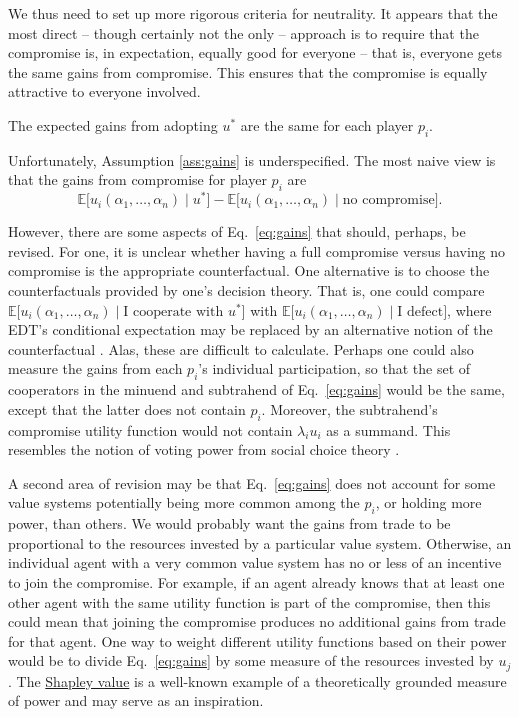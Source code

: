 We thus need to set up more rigorous criteria for neutrality. It appears
that the most direct -- though certainly not the only -- approach is to
require that the compromise is, in expectation, equally good for
everyone -- that is, everyone gets the same gains from compromise. This
ensures that the compromise is equally attractive to everyone involved.

\begin{assumption}
\label{ass:gains}
The expected gains from adopting \(u^{*}\) are the same for each player \(p_{i}\).
\end{assumption}

Unfortunately, Assumption \ref{ass:gains} is underspecified. The most naive view is that the gains
from compromise for player \(p_{i}\) are
\begin{equation}
\mathbb{E}\lbrack u_{i}(\alpha_{1},\dotsc,\alpha_{n})\mid u^{*}\rbrack - \mathbb{E}\lbrack
u_{i}(\alpha_{1},\dotsc,\alpha_{n})\mid \text{no compromise}\rbrack.
    \label{eq:gains}
\end{equation}

However, there are some aspects of Eq.~\eqref{eq:gains} that should, perhaps, be revised.
For one, it is unclear whether having a full compromise versus having no
compromise is the appropriate counterfactual. One alternative is to
choose the counterfactuals provided by one's decision theory. That is,
one could compare
\(\mathbb{E}\lbrack u_{i}(\alpha_{1},\dotsc,\alpha_{n})\mid \text{I cooperate with }u^{*}\rbrack\)
with \(\mathbb{E}\lbrack u_{i}(\alpha_{1},\dotsc,\alpha_{n})\mid \text{I defect}\rbrack\),
where EDT's conditional expectation may be replaced by an alternative
notion of the counterfactual
\parencite{Gibbard1978-nw,Hintze2014-ha}. Alas, these are
difficult to calculate. Perhaps one could also measure the gains from
each \(p_i\)'s individual participation, so that the set of
cooperators in the minuend and subtrahend of Eq.~\eqref{eq:gains} would be the same,
except that the latter does not contain \(p_{i}\). Moreover, the
subtrahend's compromise utility function would not contain
\(\lambda_{i}u_{i}\) as a summand. This resembles the notion of voting
power from social choice theory
\parencite{Cotton-Barratt2013-ql,Felsenthal1998-zv}.

A second area of revision may be that Eq.~\eqref{eq:gains} does not account for some
value systems potentially being more common among the \(p_{i}\), or
holding more power, than others. We would probably want the gains from
trade to be proportional to the resources invested by a particular value
system. Otherwise, an individual agent with a very common value system
has no or less of an incentive to join the compromise. For example, if
an agent already knows that at least one other agent with the same
utility function is part of the compromise, then this could mean that
joining the compromise produces no additional gains from trade for that
agent. One way to weight different utility functions based on their
power would be to divide Eq.~\eqref{eq:gains} by some measure of the resources invested
by \(u_{j}\). The
\href{https://en.wikipedia.org/wiki/Shapley_value}{Shapley value}
is a well-known example of a theoretically grounded measure of power and
may serve as an inspiration.

